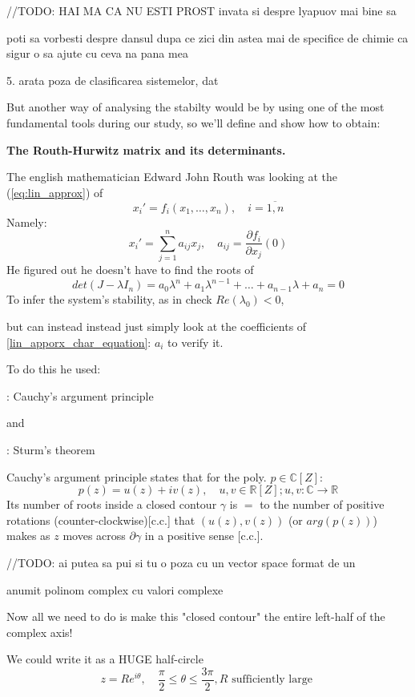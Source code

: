 \hfill\break
//TODO: HAI MA CA NU ESTI PROST invata si despre lyapuov mai bine sa

poti sa vorbesti despre dansul dupa ce zici din astea mai de
specifice de chimie ca sigur o sa ajute cu ceva na pana mea

5. arata poza de clasificarea sistemelor, dat

\hfill\break
But another way of analysing the stabilty would be by using one of
the most fundamental tools during our study, so we'll define and show
how to obtain:

\textbf{The Routh-Hurwitz matrix and its determinants.}

The english mathematician Edward John Routh was looking at the
(\ref{eq:lin_approx}) of
\[
x_i' = f_i(x_1,\dots , x_n), \quad i = \overline{1,n}
\]
Namely:
\[
x_i' =\sum_{j=1}^{n}a_{ij} x_j, \quad a_{ij} = \frac{\partial
f_i}{\partial x_j}(0)
\]
He figured out he doesn't have to find the roots of
\begin{equation}\label{lin_apporx_char_equation}
det(J - \lambda I_n) =
a_0 \lambda^n + a_1 \lambda^{n-1} + \dots + a_{n-1}\lambda + a_n = 0
\end{equation}
To infer the system's stability, as in check
$ Re(\lambda_0) < 0$,

but can instead instead just simply look at the coefficients of
\ref{lin_apporx_char_equation}: $a_{i}$ to verify it.

To do this he used:

: Cauchy's argument principle

and

: Sturm's theorem


Cauchy's argument principle states that for the poly. $p \in \mathbb{C}[Z]$:
\[
p(z) = u(z) + i v(z), \quad u, v \in \mathbb{R}[Z]; u,v : \mathbb{C}
\rightarrow \mathbb{R}
\]
Its number of roots inside a closed contour $\gamma$  is $=$ to the
number of positive rotations (counter-clockwise)[c.c.] that $(u(z),
v(z))$ (or $arg(p(z))$) makes as $z$ moves across $\partial \gamma$
in a positive sense [c.c.].

\hfill\break
//TODO: ai putea sa pui si tu o poza cu un vector space format de un
\hfill\break

anumit polinom complex cu valori complexe

Now all we need to do is make this "closed contour" the entire
left-half of the complex axis!

We could write it as a {\large HUGE} half-circle
\[
z = Re^{i \theta}, \quad \frac{\pi}{2} \leq \theta \leq \frac{3
\pi}{2}, R \text{ sufficiently large }
\]

